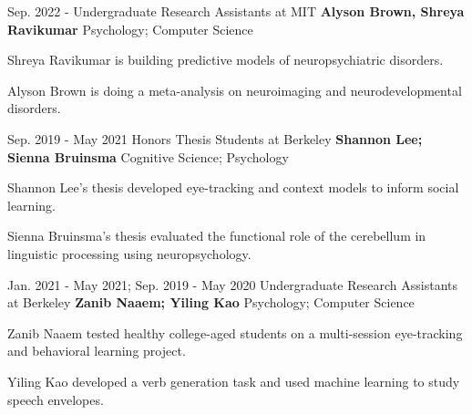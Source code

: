 

\begin{cventries}

  \cventry
    {Sep. 2022 - } %
    {Undergraduate Research Assistants at MIT} %
    {\textbf{Alyson Brown, Shreya Ravikumar}} 
    {Psychology; Computer Science} %
    {
      \begin{cvitems} %
        \item {Shreya Ravikumar is building predictive models of neuropsychiatric disorders.}
        \item {Alyson Brown is doing a meta-analysis on neuroimaging and neurodevelopmental disorders.}
      \end{cvitems}
    }
    

 
  \cventry
    {Sep. 2019 - May 2021} %
    {Honors Thesis Students at Berkeley} %
    {\textbf{Shannon Lee; Sienna Bruinsma}} 
    {Cognitive Science; Psychology} %
    {
      \begin{cvitems} %
        \item {Shannon Lee's thesis developed eye-tracking and context models to inform social learning.}
        \item {Sienna Bruinsma's thesis evaluated the functional role of the cerebellum in linguistic processing using neuropsychology.}
      \end{cvitems}
    }
    
    
  \cventry
    {Jan. 2021 - May 2021; Sep. 2019 - May 2020} %
    {Undergraduate Research Assistants at Berkeley} %
   	{\textbf{Zanib Naaem; Yiling Kao}}
   	{Psychology; Computer Science}
    {
      \begin{cvitems} %
        \item {Zanib Naaem tested healthy college-aged students on a multi-session eye-tracking and behavioral learning project.}
        \item {Yiling Kao developed a verb generation task and used machine learning to study speech envelopes.}
      \end{cvitems}
    }
    

\end{cventries}
